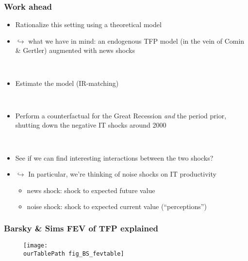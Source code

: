 \documentclass{beamer}
\def \ourTablePath {../../Tables/}
\begin{document}
\begin{frame}
	\frametitle{Work ahead}
	
\begin{itemize}
\item Rationalize this setting using a theoretical model
\item [] $\hookrightarrow$ what we have in mind: an endogenous TFP model (in the vein of Comin \& Gertler) augmented with news shocks 

\

\item Estimate the model (IR-matching)

\

\item Perform a counterfactual for the Great Recession \emph{and} the period prior, shutting down the negative IT shocks around 2000

\

\item See if we can find interesting interactions between the two shocks?
\item [] $\hookrightarrow$ In particular, we're thinking of noise shocks on IT productivity
	\begin{itemize}
	\item [] news shock: shock to expected future value
	\item [] noise shock: shock to expected current value (``perceptions'')
	\end{itemize}
\end{itemize}


   		 	
\end{frame}







\begin{frame}
	\frametitle{Barsky \& Sims FEV of TFP explained}
	\label{BS_FEV}
	

\vspace{-1cm}
\noindent
\begin{figure}
\centering
\texttt{[image: \\ourTablePath fig\_BS\_fevtable]}
\end{figure}
	
\hyperlink{related_lit}{}	
\end{frame}
\end{document}
